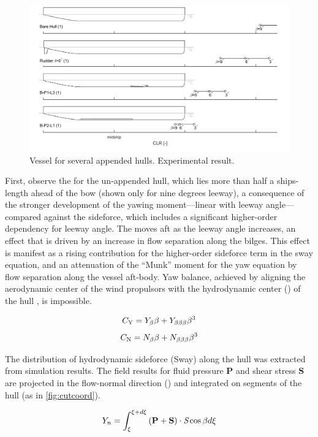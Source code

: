 \documentclass[twoside,twocolumn]{article}
\begin{document}
\begin{figure}[!th]
	\centering
	\includegraphics[width=\textwidth]{images/1_CLR_demo}
	\caption{Vessel \CLR for several appended hulls. Experimental result.}
	\label{fig:CLRdemo}
\end{figure}
\noindent
First, observe the \CLR for the un-appended hull, which lies more than half a ships-length ahead of the bow (shown only for nine degrees leeway), a consequence of the stronger development of the yawing moment—linear with leeway angle—compared against the sideforce, which includes a significant higher-order dependency for leeway angle. The \CLR moves aft as the leeway angle increases, an effect that is driven by an increase in flow separation along the bilges. This effect is manifest as a rising contribution for the higher-order sideforce term in the sway equation, and an attenuation of the “Munk” moment for the yaw equation by flow separation along the vessel aft-body. Yaw balance, achieved by aligning the aerodynamic center of the wind propulsors with the hydrodynamic center (\CLR) of the hull \cite{Claughton03}, is impossible.


\begin{equation}
C_\mathrm{Y}=Y_{\beta}\beta+Y_{\beta \beta \beta}\beta^{3}
\end{equation}
\begin{equation}
C_\mathrm{N}=N_{\beta}\beta+N_{\beta \beta \beta}\beta^{3}
\end{equation}

The distribution of hydrodynamic sideforce (Sway) along the hull was extracted from simulation results. The field results for fluid pressure $\mathbf{P}$ and shear stress $\mathbf{S}$ are projected in the flow-normal direction (\nY) and integrated on segments of the hull (as in \cref{fig:cutcoord}).

\begin{equation}
Y_n=\int_{\xi}^{\xi+d\xi} \left(\mathbf{P}+\mathbf{S}\right)  \cdot \textit{S}\cos{\beta} d\xi
\end{equation}
\end{document}
